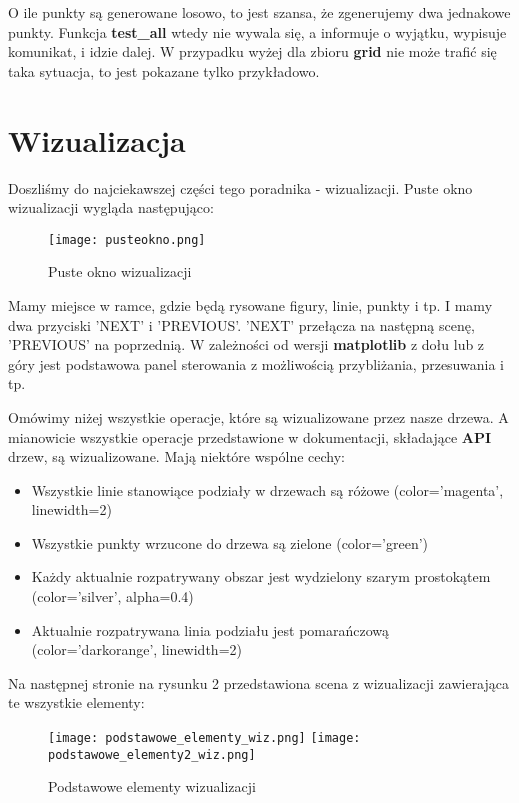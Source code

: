 \documentclass[a4paper, 12pt]{article}
\begin{document}
    \noindent
    \quad O ile punkty są generowane losowo, to jest szansa, że zgenerujemy dwa jednakowe punkty. Funkcja \textbf{test\_all} wtedy nie wywala się, a informuje o wyjątku, wypisuje komunikat, i idzie dalej. W przypadku wyżej dla zbioru \textbf{grid} nie może trafić się taka sytuacja, to jest pokazane tylko przykładowo.


  \section{Wizualizacja}
    \quad Doszliśmy do najciekawszej części tego poradnika - wizualizacji. Puste okno wizualizacji wygląda następująco:

    \begin{figure}[h!]
    \centering
      \texttt{[image: pusteokno.png]}
      \caption{Puste okno wizualizacji}
    \end{figure}

    \noindent
    \quad Mamy miejsce w ramce, gdzie będą rysowane figury, linie, punkty i tp. I mamy dwa przyciski 'NEXT' i 'PREVIOUS'. 'NEXT' przełącza na następną scenę, 'PREVIOUS' na poprzednią. W zależności od wersji \textbf{matplotlib} z dołu lub z góry jest podstawowa panel sterowania z możliwością przybliżania, przesuwania i tp.

    \noindent
    \quad Omówimy niżej wszystkie operacje, które są wizualizowane przez nasze drzewa. A mianowicie wszystkie operacje przedstawione w dokumentacji, składające \textbf{API} drzew, są wizualizowane. Mają niektóre wspólne cechy:

    \begin{itemize}
        \item Wszystkie linie stanowiące podziały w drzewach są różowe (color='magenta', linewidth=2)
        \item Wszystkie punkty wrzucone do drzewa są zielone (color='green')
        \item Każdy aktualnie rozpatrywany obszar jest wydzielony szarym prostokątem (color='silver', alpha=0.4)
        \item Aktualnie rozpatrywana linia podziału jest pomarańczową (color='darkorange', linewidth=2)
    \end{itemize}

    \noindent
    \quad Na następnej stronie na rysunku 2 przedstawiona scena z wizualizacji zawierająca te wszystkie elementy:

    \newpage
    \begin{figure}[h!]
    \centering
      \texttt{[image: podstawowe\_elementy\_wiz.png]}
      \texttt{[image: podstawowe\_elementy2\_wiz.png]}
      \caption{Podstawowe elementy wizualizacji}
    \end{figure}
\end{document}
